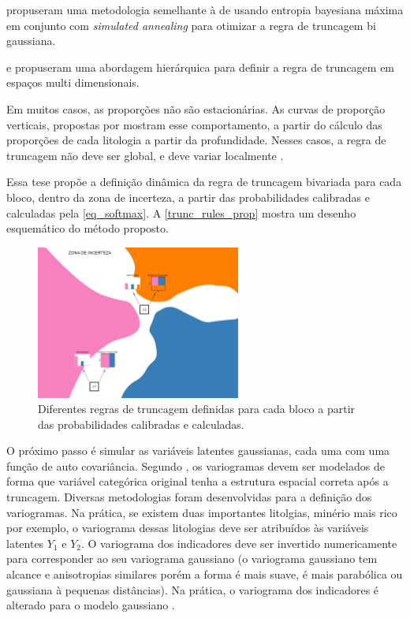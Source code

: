  propuseram uma metodologia semelhante à de  usando entropia bayesiana máxima em conjunto com \textit{simulated annealing} para otimizar a regra de truncagem bi gaussiana.

 e  propuseram uma abordagem hierárquica para definir a regra de truncagem em espaços multi dimensionais.

Em muitos casos, as proporções não são estacionárias. As curvas de proporção verticais, propostas por  mostram esse comportamento, a partir do cálculo das proporções de cada litologia a partir da profundidade. Nesses casos, a regra de truncagem não deve ser global, e deve variar localmente \cite{sadeghi_optimizing}.

Essa tese propõe a definição dinâmica da regra de truncagem bivariada para cada bloco, dentro da zona de incerteza, a partir das probabilidades calibradas e calculadas pela \autoref{eq_softmax}. A \autoref{trunc_rules_prop} mostra um desenho esquemático do método proposto.

\begin{figure}[H]
	\caption{\label{trunc_rules_prop}Diferentes regras de truncagem definidas para cada bloco a partir das probabilidades calibradas e calculadas.}
	\begin{center}
		\includegraphics[width=0.6\textwidth]{capitulo_3/trunc_rules_prop.jpg}
	\end{center}
\end{figure}

O próximo passo é simular as variáveis latentes gaussianas, cada uma com uma função de auto covariância. Segundo , os variogramas devem ser modelados de forma que variável categórica original tenha a estrutura espacial correta após a truncagem. Diversas metodologias foram desenvolvidas para a definição dos variogramas. Na prática, se existem duas importantes litolgias, minério mais rico por exemplo, o variograma dessas litologias deve ser atribuídos às variáveis latentes $Y_1$ e $ Y_2$. O variograma dos indicadores deve ser invertido numericamente para corresponder ao seu variograma gaussiano \cite{journel2004evaluation} (o variograma gaussiano tem alcance e anisotropias similares  porém a forma é mais suave, é mais parabólica ou gaussiana à pequenas distâncias). Na prática, o variograma dos indicadores é alterado para o modelo gaussiano \cite{pyrcz2014geostatistical}.

